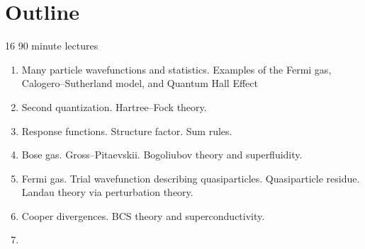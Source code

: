 
\section{Outline}

16 90 minute lectures

\begin{enumerate}
\item Many particle wavefunctions and statistics. Examples of the Fermi gas, Calogero--Sutherland model, and Quantum Hall Effect

\item Second quantization. Hartree--Fock theory.

\item Response functions. Structure factor. Sum rules. 

\item Bose gas. Gross--Pitaevskii. Bogoliubov theory and superfluidity.

\item Fermi gas. Trial wavefunction describing quasiparticles. Quasiparticle residue. Landau theory via perturbation theory. 

\item Cooper divergences. BCS theory and superconductivity. 

\item 
\end{enumerate}